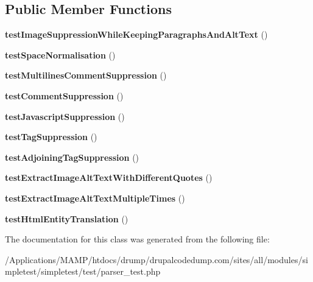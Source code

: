 \subsection*{Public Member Functions}
\begin{DoxyCompactItemize}
\item 
\hypertarget{class_test_of_text_extraction_aef6520a49cef467e0ecdfb4259c1bf51}{
{\bfseries testImageSuppressionWhileKeepingParagraphsAndAltText} ()}
\label{class_test_of_text_extraction_aef6520a49cef467e0ecdfb4259c1bf51}

\item 
\hypertarget{class_test_of_text_extraction_a290588194572cacb1161513c5253b068}{
{\bfseries testSpaceNormalisation} ()}
\label{class_test_of_text_extraction_a290588194572cacb1161513c5253b068}

\item 
\hypertarget{class_test_of_text_extraction_a5b5d2d36fbeefaa300114a982d90a270}{
{\bfseries testMultilinesCommentSuppression} ()}
\label{class_test_of_text_extraction_a5b5d2d36fbeefaa300114a982d90a270}

\item 
\hypertarget{class_test_of_text_extraction_a594dfb12f7a3c9e1232053083660ee9e}{
{\bfseries testCommentSuppression} ()}
\label{class_test_of_text_extraction_a594dfb12f7a3c9e1232053083660ee9e}

\item 
\hypertarget{class_test_of_text_extraction_a05c4c7d34e9344b78df9f3b89457ef28}{
{\bfseries testJavascriptSuppression} ()}
\label{class_test_of_text_extraction_a05c4c7d34e9344b78df9f3b89457ef28}

\item 
\hypertarget{class_test_of_text_extraction_aacacb9f53022c0b5514e8a9bd0b44de3}{
{\bfseries testTagSuppression} ()}
\label{class_test_of_text_extraction_aacacb9f53022c0b5514e8a9bd0b44de3}

\item 
\hypertarget{class_test_of_text_extraction_afc9f6fb5fdf388ecf2d99391bd065a86}{
{\bfseries testAdjoiningTagSuppression} ()}
\label{class_test_of_text_extraction_afc9f6fb5fdf388ecf2d99391bd065a86}

\item 
\hypertarget{class_test_of_text_extraction_ad38f93a044cdc763765a5747bd51c42f}{
{\bfseries testExtractImageAltTextWithDifferentQuotes} ()}
\label{class_test_of_text_extraction_ad38f93a044cdc763765a5747bd51c42f}

\item 
\hypertarget{class_test_of_text_extraction_a2a4265a0de2697d36e95231b23651e9e}{
{\bfseries testExtractImageAltTextMultipleTimes} ()}
\label{class_test_of_text_extraction_a2a4265a0de2697d36e95231b23651e9e}

\item 
\hypertarget{class_test_of_text_extraction_a019ccc7830b522621b3d829a41f19ff8}{
{\bfseries testHtmlEntityTranslation} ()}
\label{class_test_of_text_extraction_a019ccc7830b522621b3d829a41f19ff8}

\end{DoxyCompactItemize}


The documentation for this class was generated from the following file:\begin{DoxyCompactItemize}
\item 
/Applications/MAMP/htdocs/drump/drupalcodedump.com/sites/all/modules/simpletest/simpletest/test/parser\_\-test.php\end{DoxyCompactItemize}
